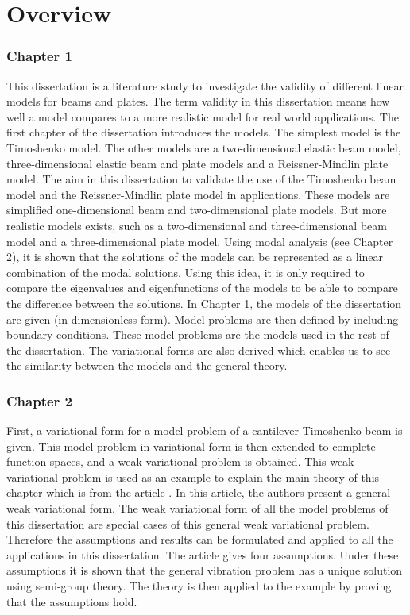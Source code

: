 \documentclass[../main.tex]{subfiles}
\begin{document}
\section{Overview}

\subsubsection{Chapter 1}
This dissertation is a literature study to investigate the validity of different linear models for beams and plates. The term validity in this dissertation means how well a model compares to a more realistic model for real world applications. The first chapter of the dissertation introduces the models. The simplest model is the Timoshenko model. The other models are a two-dimensional elastic beam model, three-dimensional elastic beam and plate models and a Reissner-Mindlin plate model. The aim in this dissertation to validate the use of the Timoshenko beam model and the Reissner-Mindlin plate model in applications. These models are simplified one-dimensional beam and two-dimensional plate models. But more realistic models exists, such as a two-dimensional and three-dimensional beam model and a three-dimensional plate model. Using modal analysis (see Chapter 2), it is shown that the solutions of the models can be represented as a linear combination of the modal solutions. Using this idea, it is only required to compare the eigenvalues and eigenfunctions of the models to be able to compare the difference between the solutions. In Chapter 1, the models of the dissertation are given (in dimensionless form).  Model problems are then defined by including boundary conditions. These model problems are the models used in the rest of the dissertation. The variational forms are also derived which enables us to see the similarity between the models and the general theory.

\subsubsection{Chapter 2}
First, a variational form for a model problem of a cantilever Timoshenko beam is given. This model problem in variational form is then extended to complete function spaces, and a weak variational problem is obtained. This weak variational problem is used as an example to explain the main theory of this chapter which is from the article \cite{VV02}. In this article, the authors present a general weak variational form. The weak variational form of all the model problems of this dissertation are special cases of this general weak variational problem. Therefore the assumptions and results can be formulated and applied to all the applications in this dissertation. The article gives four assumptions. Under these assumptions it is shown that the general vibration problem has a unique solution using semi-group theory. The theory is then applied to the example by proving that the assumptions hold.
\end{document}
